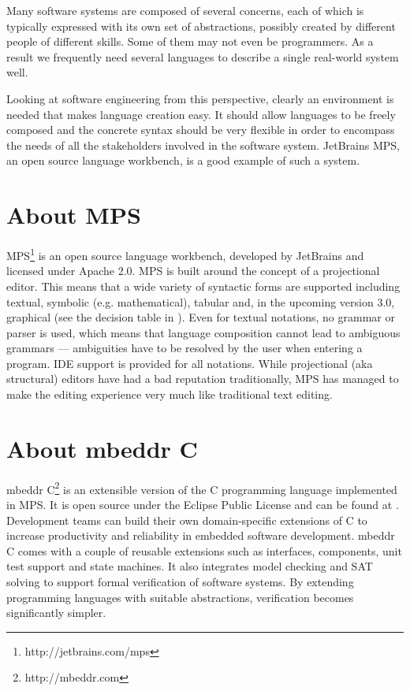 \documentclass[10pt, conference, compsocconf]{IEEEtran}
\begin{document}
Many software systems are composed of several concerns, each of which is typically expressed
with its own set of abstractions, possibly created by different people of different skills. Some of them may
not even be programmers. As a result we frequently need several languages to describe a single real-world system well.

Looking at software engineering from this perspective, clearly an environment is needed that makes
language creation easy. It should allow languages to be freely composed and the concrete
syntax should be very flexible in order to encompass the needs of all the stakeholders involved
in the software system. JetBrains MPS, an open source language workbench, is a good example of such
a system.

\section{About MPS}
 
\noindent MPS\footnote{http://jetbrains.com/mps} is an open source language
workbench, developed by JetBrains and licensed under Apache 2.0. MPS is built around the concept of a
projectional editor. This means that a wide variety of syntactic forms are supported including textual, symbolic (e.g.
mathematical), tabular and, in the upcoming version 3.0, graphical (see the
decision table in ). Even for textual notations, no grammar or
parser is used, which means that language composition cannot lead to ambiguous grammars --- ambiguities have to be
resolved by the user when entering a program. IDE support is provided for all
notations. While projectional (aka structural) editors have had a bad reputation
traditionally, MPS has managed to make the editing experience very much like
traditional text editing.
 \section{About mbeddr C}

\noindent mbeddr C\footnote{http://mbeddr.com} is an extensible version of the C
programming language implemented in MPS. It is open source under the Eclipse Public License and can
be found at . Development teams can build their own
domain-specific extensions of C to increase productivity and reliability in embedded software development. mbeddr C comes with a couple of reusable extensions such as
interfaces, components, unit test support and state machines. It also integrates
model checking and SAT solving to support formal verification of software
systems. By extending programming languages with suitable abstractions,
verification becomes significantly simpler.  
\end{document}
